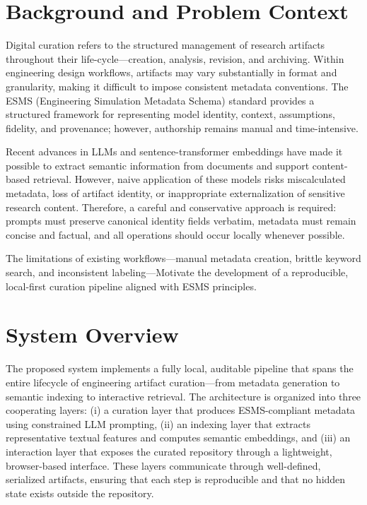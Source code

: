 \documentclass[12pt]{article}
\begin{document}
\section{Background and Problem Context}

Digital curation refers to the structured management of research artifacts throughout their life-cycle—creation, analysis, revision, and archiving. Within engineering design workflows, artifacts may vary substantially in format and granularity, making it difficult to impose consistent metadata conventions. The ESMS (Engineering Simulation Metadata Schema) standard provides a structured framework for representing model identity, context, assumptions, fidelity, and provenance; however, authorship remains manual and time-intensive.

Recent advances in LLMs and sentence-transformer embeddings have made it possible to extract semantic information from documents and support content-based retrieval. However, naive application of these models risks miscalculated metadata, loss of artifact identity, or inappropriate externalization of sensitive research content. Therefore, a careful and conservative approach is required: prompts must preserve canonical identity fields verbatim, metadata must remain concise and factual, and all operations should occur locally whenever possible.

The limitations of existing workflows—manual metadata creation, brittle keyword search, and inconsistent labeling—Motivate the development of a reproducible, local-first curation pipeline aligned with ESMS principles.

\section{System Overview}

The proposed system implements a fully local, auditable pipeline that spans the 
entire lifecycle of engineering artifact curation—from metadata generation to 
semantic indexing to interactive retrieval. The architecture is organized into 
three cooperating layers: (i) a curation layer that produces ESMS-compliant 
metadata using constrained LLM prompting, (ii) an indexing layer that extracts 
representative textual features and computes semantic embeddings, and (iii) an 
interaction layer that exposes the curated repository through a lightweight, 
browser-based interface. These layers communicate through well-defined, 
serialized artifacts, ensuring that each step is reproducible and that no hidden 
state exists outside the repository.
\end{document}
